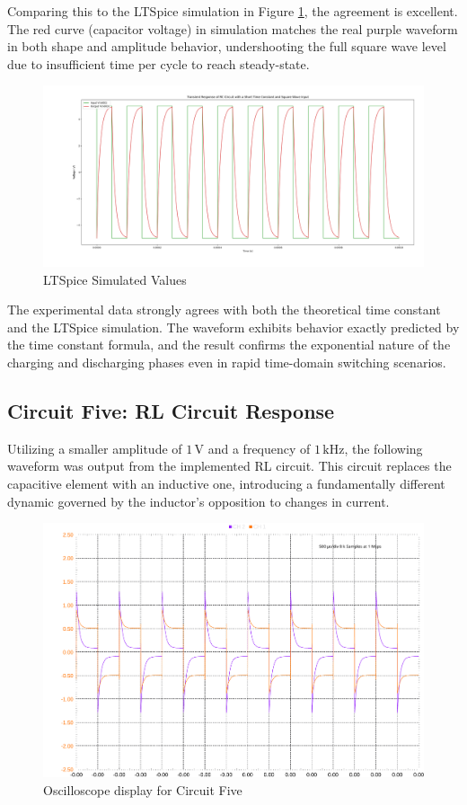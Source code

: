 \documentclass[12pt]{article}
\begin{document}
Comparing this to the LTSpice simulation in Figure \ref{fig:circuit4pspice}, the agreement is excellent. The red curve (capacitor voltage) in simulation matches the real purple waveform in both shape and amplitude behavior, undershooting the full square wave level due to insufficient time per cycle to reach steady-state.

\begin{figure}[H]
	\centering
	\includegraphics[width=16cm]{05_ltspicecircuit4}
	\caption{LTSpice Simulated Values}
	\label{fig:circuit4pspice}
\end{figure}

The experimental data strongly agrees with both the theoretical time constant and the LTSpice simulation. The waveform exhibits behavior exactly predicted by the time constant formula, and the result confirms the exponential nature of the charging and discharging phases even in rapid time-domain switching scenarios.
\subsection{Circuit Five: RL Circuit Response}

Utilizing a smaller amplitude of $1\,\mathrm{V}$ and a frequency of $1\,\mathrm{kHz}$, the following waveform was output from the implemented RL circuit. This circuit replaces the capacitive element with an inductive one, introducing a fundamentally different dynamic governed by the inductor’s opposition to changes in current.

\begin{figure}[H]
	\centering
	\includegraphics[width=16cm]{05_scopy3}
	\caption{Oscilloscope display for Circuit Five}
	\label{fig:circuit5oscope}
\end{figure}
\end{document}
